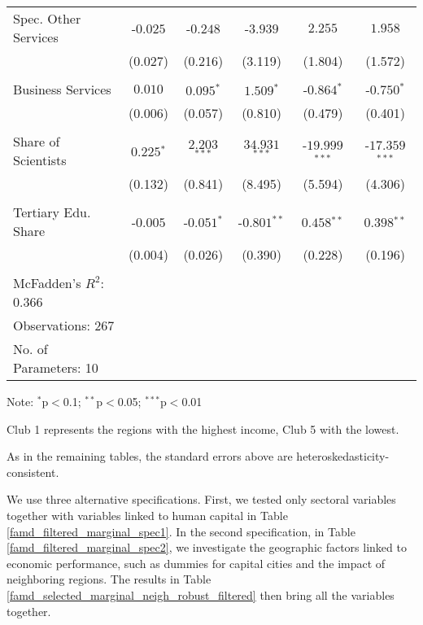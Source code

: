 \documentclass[11pt]{article}
\begin{document}
\begin{table}[!htbp]
{\begin{minipage}{\textwidth}
\begin{tabular}{@{\extracolsep{5pt}} lccccc}
Spec. Other Services & $ $-$0.025$ & $ $-$0.248$ & $ $-$3.939$ & $2.255$ & $1.958$ \\ 
& (0.027) &  (0.216) & (3.119) & (1.804) & (1.572)\\
&\\
Business Services & $0.010$ & $0.095$$^{*}$  & $1.509$$^{*}$  & $ $-$0.864$$^{*}$  & $ $-$0.750$$^{*}$  \\
& (0.006) &  (0.057) & (0.810) & (0.479) & (0.401)\\
&\\
Share of Scientists & $0.225$$^{*}$  & $2.203$$^{***}$  & $34.931$$^{***}$  & $ $-$19.999$$^{***}$  & $ $-$17.359$$^{***}$  \\ 
& (0.132) &  (0.841) & (8.495) & (5.594) & (4.306)\\
&\\
Tertiary Edu. Share & $ $-$0.005$ & $ $-$0.051$$^{*}$  & $ $-$0.801$$^{**}$  & $0.458$$^{**}$  & $0.398$$^{**}$  \\
& (0.004) &  (0.026) & (0.390) & (0.228) & (0.196)\\
\hline \hline \\[-1.8ex]
McFadden's $R^{2}$: 0.366 \\
Observations: 267\\
No. of Parameters: 10\\
\hline
\end{tabular}
\begin{tablenotes}
\small 
\item Note: $^{*}$p$<$0.1; $^{**}$p$<$0.05; $^{***}$p$<$0.01
\item Club 1 represents the regions with the highest income, Club 5 with the lowest.
\item As in the remaining tables, the standard errors above are heteroskedasticity-consistent.
\end{tablenotes}
\end{minipage}}
\end{table} 



We use three alternative specifications. First, we tested only sectoral variables together with variables linked to human capital in Table \ref{famd_filtered_marginal_spec1}. In the second specification, in Table \ref{famd_filtered_marginal_spec2},  we investigate the geographic factors linked to economic performance, such as dummies for capital cities and the impact of neighboring regions. The results in Table \ref{famd_selected_marginal_neigh_robust_filtered} then bring all the variables together. 
\end{document}
